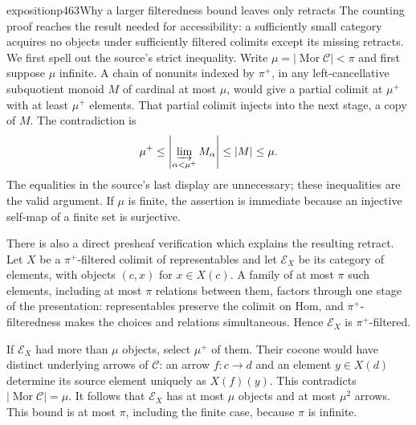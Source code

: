 \begin{dcomment}{exposition}{p463}{Why a larger filteredness bound leaves only retracts}
The counting proof reaches the result needed for accessibility: a sufficiently small category acquires no objects under sufficiently filtered colimits except its missing retracts. We first spell out the source's strict inequality. Write $\mu=|\operatorname{Mor}\mathcal C|<\pi$ and first suppose $\mu$ infinite. A chain of nonunits indexed by $\pi^+$, in any left-cancellative subquotient monoid $M$ of cardinal at most $\mu$, would give a partial colimit at $\mu^+$ with at least $\mu^+$ elements. That partial colimit injects into the next stage, a copy of $M$. The contradiction is
\[
\mu^+\le \left|\varinjlim_{\alpha<\mu^+}M_\alpha\right|
\le |M|\le\mu.
\]
The equalities in the source's last display are unnecessary; these inequalities are the valid argument. If $\mu$ is finite, the assertion is immediate because an injective self-map of a finite set is surjective.

There is also a direct presheaf verification which explains the resulting retract. Let $X$ be a $\pi^+$-filtered colimit of representables and let $\mathcal E_X$ be its category of elements, with objects $(c,x)$ for $x\in X(c)$. A family of at most $\pi$ such elements, including at most $\pi$ relations between them, factors through one stage of the presentation: representables preserve the colimit on Hom, and $\pi^+$-filteredness makes the choices and relations simultaneous. Hence $\mathcal E_X$ is $\pi^+$-filtered.

If $\mathcal E_X$ had more than $\mu$ objects, select $\mu^+$ of them. Their cocone would have distinct underlying arrows of $\mathcal C$: an arrow $f:c\to d$ and an element $y\in X(d)$ determine its source element uniquely as $X(f)(y)$. This contradicts $|\operatorname{Mor}\mathcal C|=\mu$. It follows that $\mathcal E_X$ has at most $\mu$ objects and at most $\mu^2$ arrows. This bound is at most $\pi$, including the finite case, because $\pi$ is infinite.


\end{dcomment}
